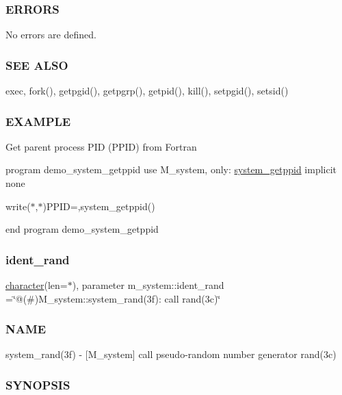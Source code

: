 \subsubsection*{E\+R\+R\+O\+RS}

No errors are defined.

\subsubsection*{S\+EE A\+L\+SO}

exec, fork(), getpgid(), getpgrp(), getpid(), kill(), setpgid(), setsid()

\subsubsection*{E\+X\+A\+M\+P\+LE}

Get parent process P\+ID (P\+P\+ID) from Fortran

program demo\+\_\+system\+\_\+getppid use M\+\_\+system, only\+: \hyperlink{interfacem__system_1_1system__getppid}{system\+\_\+getppid} implicit none

write($\ast$,$\ast$)\textquotesingle{}P\+P\+ID=\textquotesingle{},system\+\_\+getppid()

end program demo\+\_\+system\+\_\+getppid \mbox{\label{namespacem__system_a7abe4c85d9ea573a1492865e21cee2be}} 
\subsubsection{\texorpdfstring{ident\+\_\+rand}{ident\_rand}}
{\footnotesize\ttfamily \hyperlink{option__stopwatch_83_8txt_abd4b21fbbd175834027b5224bfe97e66}{character}(len=$\ast$), parameter m\+\_\+system\+::ident\+\_\+rand =\char`\"{}@(\#)M\+\_\+system\+::system\+\_\+rand(3f)\+: call rand(3c)\char`\"{}\hspace{0.3cm}{\ttfamily [private]}}



\subsubsection*{N\+A\+ME}

system\+\_\+rand(3f) -\/ \mbox{[}M\+\_\+system\mbox{]} call pseudo-\/random number generator rand(3c) \subsubsection*{S\+Y\+N\+O\+P\+S\+IS}

